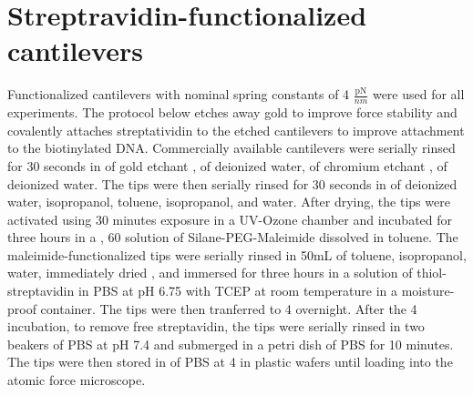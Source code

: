 \section{Streptravidin-functionalized cantilevers}

\firstp Functionalized cantilevers with nominal spring constants of 4 $\frac{\text{pN}}{nm}$  were used for all experiments. The protocol below etches away gold to improve force stability\cite{sullan_atomic_2013} and covalently attaches streptatividin to the etched cantilevers to improve attachment to the biotinylated DNA. Commercially available cantilevers  were serially rinsed for 30 seconds in  of gold etchant ,  of deionized water,  of chromium etchant ,  of deionized water. The tips were then serially rinsed for 30 seconds in  of deionized water, isopropanol, toluene, isopropanol, and water. After drying, the tips were activated using 30 minutes exposure in a UV-Ozone chamber and incubated for three hours in a , 60\degreeC{} solution of   Silane-PEG-Maleimide  dissolved in toluene. The maleimide-functionalized tips were serially rinsed in 50mL of toluene, isopropanol, water, immediately dried , and immersed for three hours in a  solution of thiol-streptavidin  in PBS at pH 6.75 with  TCEP  at room temperature in a moisture-proof container. The tips were then tranferred to 4\degreeC{} overnight. After the 4\degreeC{} incubation, to remove free streptavidin, the tips were serially rinsed in two  beakers of PBS at pH 7.4 and submerged in a  petri dish of PBS for 10 minutes. The tips were then stored in  of PBS at 4\degreeC{} in plastic wafers  until loading into the atomic force microscope. \pl


